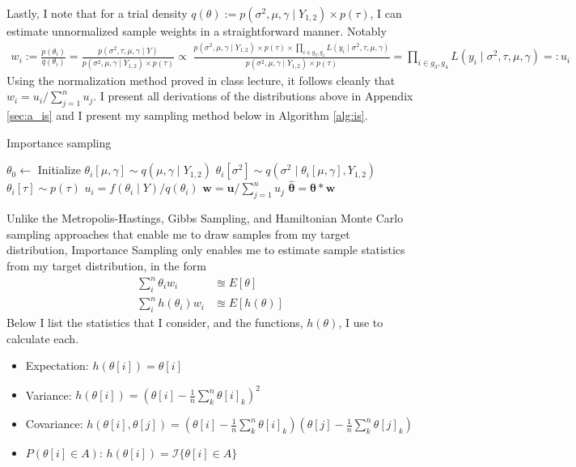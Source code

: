\documentclass{article}
\begin{document}
Lastly, I note that for a trial density $q(\theta) := p(\sigma^2, \mu, \gamma \mid Y_{1,2}) \times p(\tau)$, I can estimate unnormalized sample weights in a straightforward manner. Notably
\begin{align}
  w_i := \frac{p(\theta_i)}{q(\theta_i)} = \frac{p(\sigma^2, \tau, \mu, \gamma \mid Y)}{p(\sigma^2, \mu, \gamma \mid Y_{1,2}) \times p(\tau)} \propto\; \frac{p(\sigma^2, \mu, \gamma \mid Y_{1,2}) \times p(\tau) \times \prod_{i\in g_3, g_4} L(y_i \mid \sigma^2, \tau, \mu, \gamma)}{p(\sigma^2, \mu, \gamma \mid Y_{1,2})\times p(\tau)} = \prod_{i\in g_3, g_4} L(y_i \mid \sigma^2, \tau, \mu, \gamma) =: u_i
\end{align}
Using the normalization method proved in class lecture, it follows cleanly that $w_i = u_i / \sum_{j=1}^nu_j$. I present all derivations of the distributions above in Appendix \ref{sec:a_is} and I present my sampling method below in Algorithm \ref{alg:is}.

\begin{algorithm}[H]
\caption{\label{alg:is} Importance sampling}
  \begin{algorithmic}
    \State $\theta_0 \longleftarrow$  Initialize
      \State $\theta_i[\mu, \gamma] \sim q(\mu, \gamma \mid Y_{1,2})$
      \State $\theta_i[\sigma^2] \sim q(\sigma^2 \mid \theta_i[\mu, \gamma], Y_{1,2})$
      \State $\theta_i[\tau] \sim p(\tau)$
      \State $u_i = f(\theta_i \mid Y) / q(\theta_i)$  
    \EndFor
    \State $\textbf{w} = \textbf{u} / \sum_{j=1}^n u_j$ 
    \State $\hat{\boldsymbol{\theta}} = \boldsymbol{\theta}*\textbf{w}$  
  \end{algorithmic}
\end{algorithm}

Unlike the Metropolis-Hastings, Gibbs Sampling, and Hamiltonian Monte Carlo sampling approaches that enable me to draw samples from my target distribution, Importance Sampling only enables me to estimate sample statistics from my target distribution, in the form
\begin{align}
  \sum_i^n\theta_i w_i &\approxeq E\left[ \theta\right]\\
  \sum_i^nh(\theta_i)w_i &\approxeq E\left[ h(\theta) \right]
\end{align}
Below I list the statistics that I consider, and the functions, $h(\theta)$, I use to calculate each.
\begin{itemize}
  \item Expectation: $h(\theta[i]) = \theta[i]$
  \item Variance: $h(\theta[i]) = \left(\theta[i] - \frac{1}{n}\sum_k^n\theta[i]_k\right)^2$
  \item Covariance: $h(\theta[i], \theta[j]) = \left(\theta[i] - \frac{1}{n}\sum_k^n\theta[i]_k\right)\left(\theta[j] - \frac{1}{n}\sum_k^n\theta[j]_k\right)$
  \item $P(\theta[i] \in A)$: $h(\theta[i]) = \mathcal{I}\{ \theta[i] \in A \}$
\end{itemize}
\end{document}
